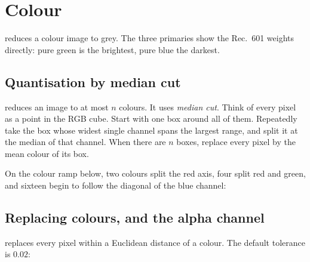 \section{Colour}
\label{sec:img-colourops}

 reduces a colour image to grey. The three primaries show the
Rec.~601 weights directly: pure green is the brightest, pure blue the darkest.


\subsection{Quantisation by median cut}

 reduces an image to at most \(n\) colours. It uses
\emph{median cut}. Think of every
pixel as a point in the RGB cube. Start with one box around all of them. Repeatedly
take the box whose widest single channel spans the largest range, and split it at
the median of that channel. When there are \(n\) boxes, replace every pixel by the
mean colour of its box.

\begin{codepairs}
\end{codepairs}

On the colour ramp below, two colours split the red axis, four split red and
green, and sixteen begin to follow the diagonal of the blue channel:



\subsection{Replacing colours, and the alpha channel}

 replaces every pixel within a Euclidean distance of a colour.
The default tolerance is \(0.02\):

